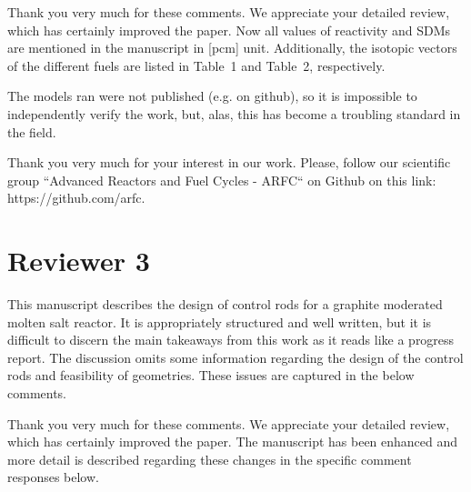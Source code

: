 \documentclass[answers,11pt]{exam}
\begin{document}
\begin{questions}
        \begin{solution}
        Thank you very much for these comments. We appreciate your detailed review, which has certainly improved the paper. Now all values of reactivity and SDMs are mentioned in the manuscript in [pcm] unit. Additionally, the isotopic vectors of the different fuels are listed in Table~1 and Table~2, respectively.
        
        \end{solution}


        \question The models ran were not published (e.g. on github), so it is impossible to independently verify the work, but, alas, this has become a troubling standard in the field.
        
        \begin{solution}
                 Thank you very much for your interest in our work. Please, follow our scientific group ``Advanced Reactors and Fuel Cycles -
                 ARFC`` on Github on this link: https://github.com/arfc.   

                 
        \end{solution}

      
\section*{Reviewer 3}
        \question This manuscript describes the design of control rods for a graphite moderated molten salt reactor. It is appropriately structured and well written, but it is difficult to discern the main takeaways from this work as it reads like a progress report. The discussion omits some information regarding the design of the control rods and feasibility of geometries. These issues are captured in the below comments.
        
        \begin{solution}
        	 Thank you very much for these comments. We appreciate your detailed review, which has certainly improved the paper. The manuscript has been enhanced and more detail is described regarding these changes in the specific comment responses below.
        	

        \end{solution}


\end{questions}
\end{document}
